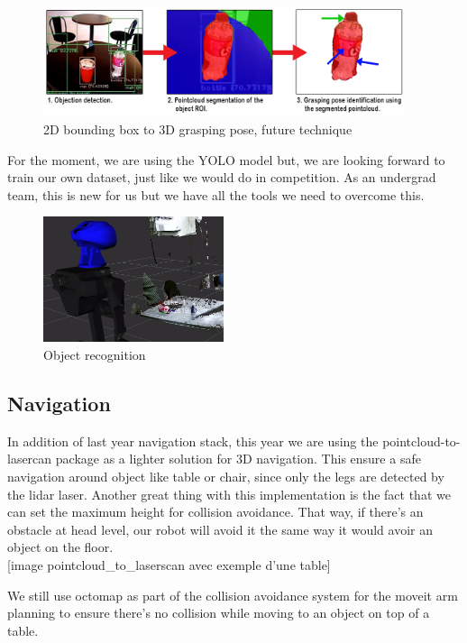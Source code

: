 \documentclass[runningheads,a4paper]{llncs}
\begin{document}
\begin{figure}
  \centering
  \includegraphics[width=300pt]{images/frame_to_box2.png}
  \caption{2D bounding box to 3D grasping pose, future technique}
\end{figure}


For the moment, we are using the YOLO model but, we are looking forward to train our own dataset, just like we would do in competition. As an undergrad team, this is new for us but we have all the tools we need to overcome this. \\

\ifdraft
\begin{figure}
  \centering
  \includegraphics[width=150pt]{images/objectreco.png}
  \caption{Object recognition}
\end{figure}
\fi

\subsection{Navigation}
\tab In addition of last year navigation stack, this year we are using the pointcloud-to-lasercan package as a lighter solution for 3D navigation. This ensure a safe navigation around object like table or chair, since only the legs are detected by the lidar laser. Another great thing with this implementation is the fact that we can set the maximum height for collision avoidance. That way, if there’s an obstacle at head level, our robot will avoid it the same way it would avoir an object on the floor. \\

[image pointcloud\_to\_laserscan avec exemple d’une table]

We still use octomap as part of the collision avoidance system for the moveit arm planning to ensure there’s no collision while moving to an object on top of a table.\\
\end{document}
